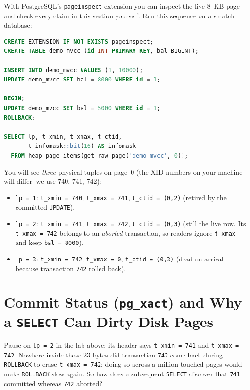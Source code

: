 \begin{labbox}
With PostgreSQL's \texttt{pageinspect} extension you can inspect the live 8~KB page and check every claim in this section yourself. Run this sequence on a scratch database:

\begin{lstlisting}[language=SQL]
CREATE EXTENSION IF NOT EXISTS pageinspect;
CREATE TABLE demo_mvcc (id INT PRIMARY KEY, bal BIGINT);

INSERT INTO demo_mvcc VALUES (1, 10000);
UPDATE demo_mvcc SET bal = 8000 WHERE id = 1;

BEGIN;
UPDATE demo_mvcc SET bal = 5000 WHERE id = 1;
ROLLBACK;

SELECT lp, t_xmin, t_xmax, t_ctid,
       t_infomask::bit(16) AS infomask
  FROM heap_page_items(get_raw_page('demo_mvcc', 0));
\end{lstlisting}

You will see \emph{three} physical tuples on page~0 (the XID numbers on your machine will differ; we use 740, 741, 742):
\begin{itemize}
  \item \texttt{lp = 1}: \texttt{t\_xmin = 740}, \texttt{t\_xmax = 741}, \texttt{t\_ctid = (0,2)} (retired by the committed \texttt{UPDATE}).
  \item \texttt{lp = 2}: \texttt{t\_xmin = 741}, \texttt{t\_xmax = 742}, \texttt{t\_ctid = (0,3)} (still the live row. Its \texttt{t\_xmax = 742} belongs to an \emph{aborted} transaction, so readers ignore \texttt{t\_xmax} and keep \texttt{bal = 8000}).
  \item \texttt{lp = 3}: \texttt{t\_xmin = 742}, \texttt{t\_xmax = 0}, \texttt{t\_ctid = (0,3)} (dead on arrival because transaction \texttt{742} rolled back).
\end{itemize}
\end{labbox}

\section{Commit Status (\texttt{pg\_xact}) and Why a \texttt{SELECT} Can Dirty Disk Pages}
\label{ch05:clog-hint-bits}

Pause on \texttt{lp = 2} in the lab above: its header says \texttt{t\_xmin = 741} and \texttt{t\_xmax = 742}. Nowhere inside those 23 bytes did transaction \texttt{742} come back during \texttt{ROLLBACK} to erase \texttt{t\_xmax = 742}; doing so across a million touched pages would make \texttt{ROLLBACK} slow again. So how does a subsequent \texttt{SELECT} discover that \texttt{741} committed whereas \texttt{742} aborted?

